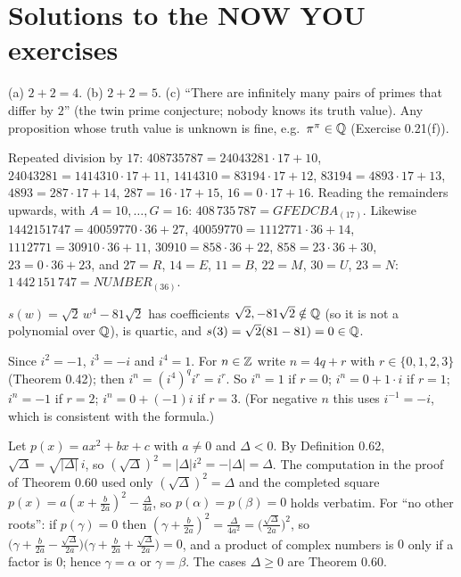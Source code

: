 \renewcommand{\chapterprefix}{Appendix}\renewcommand{\thechapter}{S}
\chapter{Solutions to the NOW YOU exercises}

 (a) $2+2=4$. (b) $2+2=5$. (c) ``There are infinitely many pairs of primes that differ by $2$'' (the twin prime conjecture; nobody knows its truth value). Any proposition whose truth value is unknown is fine, e.g.\ $\pi^\pi\in\mathbb{Q}$ (Exercise 0.21(f)).

 Repeated division by $17$: $408735787=24043281\cdot17+10$, $24043281=1414310\cdot17+11$, $1414310=83194\cdot17+12$, $83194=4893\cdot17+13$, $4893=287\cdot17+14$, $287=16\cdot17+15$, $16=0\cdot17+16$. Reading the remainders upwards, with $A=10,\dots,G=16$: $408\,735\,787=GFEDCBA_{(17)}$. Likewise $1442151747=40059770\cdot36+27$, $40059770=1112771\cdot36+14$, $1112771=30910\cdot36+11$, $30910=858\cdot36+22$, $858=23\cdot36+30$, $23=0\cdot36+23$, and $27=R$, $14=E$, $11=B$, $22=M$, $30=U$, $23=N$: $1\,442\,151\,747=NUMBER_{(36)}$.

 $s(w)=\sqrt2\,w^4-81\sqrt2$ has coefficients $\sqrt2,-81\sqrt2\notin\mathbb{Q}$ (so it is not a polynomial over $\mathbb{Q}$), is quartic, and $s(3)=\sqrt2(81-81)=0\in\mathbb{Q}$.

 Since $i^2=-1$, $i^3=-i$ and $i^4=1$. For $n\in\mathbb{Z}$ write $n=4q+r$ with $r\in\{0,1,2,3\}$ (Theorem 0.42); then $i^n=(i^4)^qi^r=i^r$. So $i^n=1$ if $r=0$; $i^n=0+1\cdot i$ if $r=1$; $i^n=-1$ if $r=2$; $i^n=0+(-1)i$ if $r=3$. (For negative $n$ this uses $i^{-1}=-i$, which is consistent with the formula.)

 Let $p(x)=ax^2+bx+c$ with $a\ne0$ and $\Delta<0$. By Definition 0.62, $\sqrt\Delta=\sqrt{|\Delta|}\,i$, so $(\sqrt\Delta)^2=|\Delta|i^2=-|\Delta|=\Delta$. The computation in the proof of Theorem 0.60 used only $(\sqrt\Delta)^2=\Delta$ and the completed square $p(x)=a(x+\frac b{2a})^2-\frac\Delta{4a}$, so $p(\alpha)=p(\beta)=0$ holds verbatim. For ``no other roots'': if $p(\gamma)=0$ then $(\gamma+\frac b{2a})^2=\frac{\Delta}{4a^2}=\big(\frac{\sqrt\Delta}{2a}\big)^2$, so $\big(\gamma+\frac b{2a}-\frac{\sqrt\Delta}{2a}\big)\big(\gamma+\frac b{2a}+\frac{\sqrt\Delta}{2a}\big)=0$, and a product of complex numbers is $0$ only if a factor is $0$; hence $\gamma=\alpha$ or $\gamma=\beta$. The cases $\Delta\ge0$ are Theorem 0.60.

